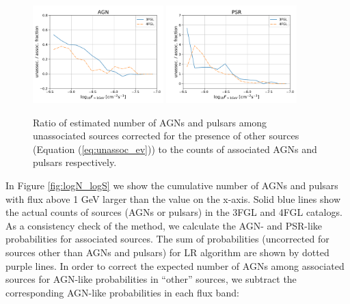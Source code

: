\begin{figure}[h]
\center
\includegraphics[width=0.45\textwidth]{plots/N_logS_diff_AGN.pdf}
\includegraphics[width=0.45\textwidth]{plots/N_logS_diff_PSR.pdf}
\caption{Ratio of estimated number of AGNs and pulsars among unassociated sources corrected for the presence of other sources (Equation (\ref{eq:unassoc_ev})) to the counts of associated AGNs and pulsars respectively.}  
\label{fig:unass_vs_ass_frac}
\end{figure}




In Figure \ref{fig:logN_logS} we show the cumulative number of AGNs and pulsars with flux above 1 GeV larger than the
value on the x-axis.
Solid blue lines show the actual counts of sources (AGNs or pulsars) in the 3FGL and 4FGL catalogs.
As a consistency check of the method, we calculate the AGN- and PSR-like probabilities for associated sources.
The sum of probabilities (uncorrected for sources other than AGNs and pulsars) for LR algorithm are shown by dotted purple lines.
In order to correct the expected number of AGNs among associated sources for AGN-like probabilities in ``other'' sources, 
we subtract the corresponding AGN-like probabilities in each flux band:

